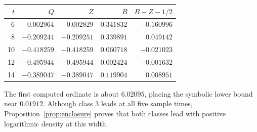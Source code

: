 \begin{center}
\begin{tabular}{r@{\qquad}r@{\qquad}r@{\qquad}r@{\qquad}r}
\toprule
$t$ & $Q$ & $Z$ & $B$ & $B-Z-1/2$\\
\midrule
 6 & $ 0.002964$ & $ 0.002829$ & $0.341832$ & $-0.160996$\\
 8 & $-0.209244$ & $-0.209251$ & $0.339891$ & $ 0.049142$\\
10 & $-0.418259$ & $-0.418259$ & $0.060718$ & $-0.021023$\\
12 & $-0.495944$ & $-0.495944$ & $0.002424$ & $-0.001632$\\
14 & $-0.389047$ & $-0.389047$ & $0.119904$ & $ 0.008951$\\
\bottomrule
\end{tabular}
\end{center}

The first computed ordinate is about $6.02095$, placing the
symbolic lower bound near $0.01912$. Although class $3$ leads at all
five sample times, Proposition~\ref{prop:enclosure} proves that both
classes lead with positive logarithmic density at this width.
